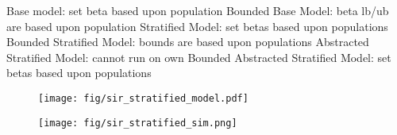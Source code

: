 
Base model: set beta based upon population
Bounded Base Model: beta lb/ub are based upon population
Stratified Model: set betas based upon populations
Bounded Stratified Model: bounds are based upon populations
Abstracted Stratified Model: cannot run on own
Bounded Abstracted Stratified Model: set betas based upon populations


\begin{figure}
    \texttt{[image: fig/sir\_stratified\_model.pdf]}
\end{figure}

\begin{figure}
    \texttt{[image: fig/sir\_stratified\_sim.png]}
\end{figure}